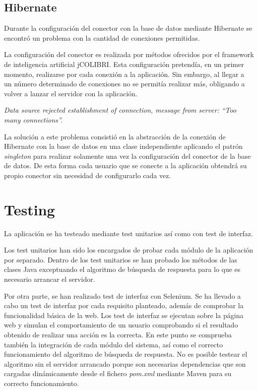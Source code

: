 \subsection{Hibernate}

Durante la configuración del conector con la base de datos mediante Hibernate se encontró un problema con la cantidad de conexiones permitidas.

La configuración del conector es realizada por métodos ofrecidos por el framework de inteligencia artificial jCOLIBRI. Esta configuración pretendía, en un primer momento, realizarse por cada conexión a la aplicación. Sin embargo, al llegar a un número determinado de conexiones no se permitía realizar más, obligando a volver a lanzar el servidor con la aplicación.

\emph{Data source rejected establishment of connection, message from server: “Too many connections”.}

La solución a este problema consistió en la abstracción de la conexión de Hibernate con la base de datos en una clase independiente aplicando el patrón \emph{singleton} para realizar solamente una vez la configuración del conector de la base de datos. De esta forma cada usuario que se conecte a la aplicación obtendrá su propio conector sin necesidad de configurarlo cada vez.


\section{Testing}

La aplicación se ha testeado mediante test unitarios así como con test de interfaz.

Los test unitarios han sido los encargados de probar cada módulo de la aplicación por separado. Dentro de los test unitarios se han probado los métodos de las clases Java exceptuando el algoritmo de búsqueda de respuesta para lo que es necesario arrancar el servidor.

Por otra parte, se han realizado test de interfaz con Selenium. Se ha llevado a cabo un test de interfaz por cada requisito planteado, además de comprobar la funcionalidad básica de la web. Los test de interfaz se ejecutan sobre la página web y simulan el comportamiento de un usuario comprobando si el resultado obtenido de realizar una acción es la correcta. En este punto se comprueba también la integración de cada módulo del sistema, así como el correcto funcionamiento del algoritmo de búsqueda de respuesta. No es posible testear el algoritmo sin el servidor arrancado porque son necesarias dependencias que son cargadas dinámicamente desde el fichero \emph{pom.xml} mediante Maven para su correcto funcionamiento.

